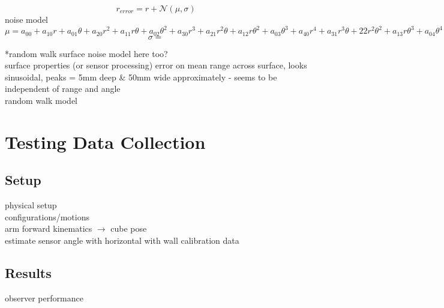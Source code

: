 		\begin{equation}
			r_{error} = r + \mathcal{N}(\mu,\sigma)
		\end{equation}	
		noise model
		\begin{equation}	
			 	\mu = a_{00} + a_{10}r + a_{01}\theta + a_{20}r^2 + a_{11}r\theta + a_{02}\theta^2
			 	      + a_{30}r^3 + a_{21}r^2\theta + a_{12}r\theta^2 + a_{03}\theta^3 + a_{40}r^4 + a_{31}r^3\theta + {22}r^2\theta^2 + a_{13}r\theta^3 + a_{04}\theta^4 	
		\end{equation}
		\begin{equation}
			\sigma = 
		\end{equation}
		
		*random walk surface noise model here too?\\
		surface properties (or sensor processing) error on mean range across surface, looks sinusoidal, peaks = 5mm deep \& 50mm wide approximately - seems to be independent of range and angle\\
		random walk model

\section{Testing Data Collection}
	\subsection{Setup}
		physical setup\\
		configurations/motions\\
		arm forward kinematics $\rightarrow$ cube pose\\
		estimate sensor angle with horizontal with wall calibration data		
		
	\subsection{Results}
		observer performance

